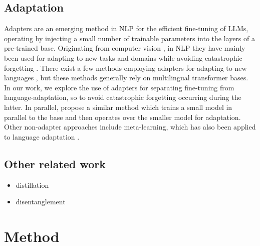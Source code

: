 \documentclass[11pt]{article}
\begin{document}
\subsection{Adaptation}

Adapters \citep{houlsby_parameter-efficient_2019} are an emerging method in NLP for the efficient
fine-tuning of LLMs, operating by injecting a small number of trainable parameters into the layers
of a pre-trained base. Originating from computer vision \citep{rebuffi_learning_2017}, in NLP they
have mainly been used for adapting to new tasks \citep{stickland_bert_2019} and domains
\citep{bapna_simple_2019} while avoiding catastrophic forgetting
\citep{mccloskey_catastrophic_1989}. There exist a few methods employing adapters for adapting to
new languages \citep{pfeiffer_mad-x_2020, ustun_hyper-x_2022}, but these methods generally rely on
multilingual transformer bases. In our work, we explore the use of adapters for separating
fine-tuning from language-adaptation, so to avoid catastrophic forgetting occurring during the
latter. In parallel, \citet{marchisio_mini-model_2022} propose a similar method which trains a small
model in parallel to the base and then operates over the smaller model for adaptation. Other
non-adapter approaches include meta-learning, which has also been applied to language adaptation
\citep{nooralahzadeh_zero-shot_2020}.

\subsection{Other related work}
\begin{itemize}
	\item distillation
	\item disentanglement
\end{itemize}

\section{Method}\label{sec:method}
\end{document}
